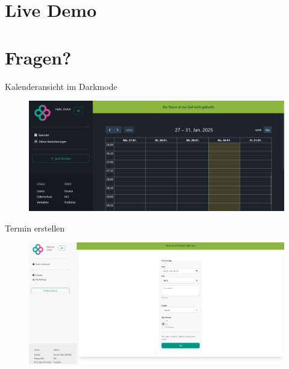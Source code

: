 \section{Live Demo}

\section{Fragen?}

\begin{frame}{}
    \thispagestyle{plain}
\end{frame}

\begin{frame}{Kalenderansicht im Darkmode}
    \thispagestyle{plain}
    \begin{figure}
        \centering
        \includegraphics[width=1\linewidth]{pictures/calendar_dark.png}
        \label{fig:enter-label}
    \end{figure}
\end{frame}

\begin{frame}{Termin erstellen}
    \thispagestyle{plain}
    \begin{figure}
        \centering
        \includegraphics[width=1\linewidth]{pictures/bookings_create.png}
        \label{fig:enter-label}
    \end{figure}
\end{frame}

